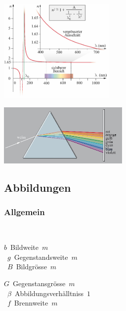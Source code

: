 \begin{center}
	\begin{minipage}{0.25\textwidth}
		\includegraphics[height=5cm,keepaspectratio=true]{Images/dispersion_graph.png}
	\end{minipage}%
	\begin{minipage}{0.3\textwidth}
		\includegraphics[height=3cm,keepaspectratio=true]{Images/dispersion_prisma.png}
	\end{minipage}
\end{center}


\subsection{Abbildungen}
\subsubsection{Allgemein}
 \\
\begin{center}
	\begin{minipage}{0.3\textwidth}
		\unit{$ b $}{Bildweite}{$ m $} \\
		\unit{$ g $}{Gegenstandsweite}{$ m $} \\
		\unit{$ B $}{Bildgrösse}{$ m $}
	\end{minipage}%
	\begin{minipage}{0.3\textwidth}
		\unit{$ G $}{Gegenstansgrösse}{$ m $} \\
		\unit{$ \beta $}{Abbildungsverhälltniss}{$ 1 $} \\
		\unit{$ f $}{Brennweite}{$ m $}
	\end{minipage}
\end{center}

